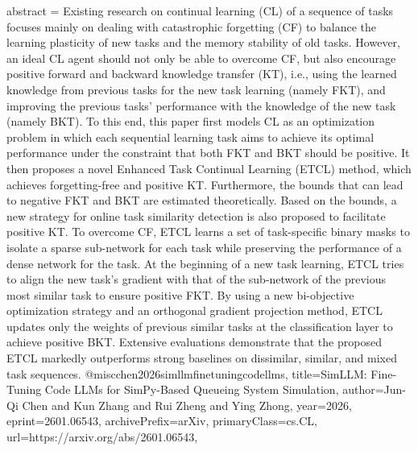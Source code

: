 {      abstract = {Existing research on continual learning (CL) of a sequence of tasks focuses mainly on dealing with catastrophic forgetting (CF) to balance the learning plasticity of new tasks and the memory stability of old tasks. However, an ideal CL agent should not only be able to overcome CF, but also encourage positive forward and backward knowledge transfer (KT), i.e., using the learned knowledge from previous tasks for the new task learning (namely FKT), and improving the previous tasks' performance with the knowledge of the new task (namely BKT). To this end, this paper first models CL as an optimization problem in which each sequential learning task aims to achieve its optimal performance under the constraint that both FKT and BKT should be positive. It then proposes a novel Enhanced Task Continual Learning (ETCL) method, which achieves forgetting-free and positive KT. Furthermore, the bounds that can lead to negative FKT and BKT are estimated theoretically. Based on the bounds, a new strategy for online task similarity detection is also proposed to facilitate positive KT. To overcome CF, ETCL learns a set of task-specific binary masks to isolate a sparse sub-network for each task while preserving the performance of a dense network for the task. At the beginning of a new task learning, ETCL tries to align the new task's gradient with that of the sub-network of the previous most similar task to ensure positive FKT. By using a new bi-objective optimization strategy and an orthogonal gradient projection method, ETCL updates only the weights of previous similar tasks at the classification layer to achieve positive BKT. Extensive evaluations demonstrate that the proposed ETCL markedly outperforms strong baselines on dissimilar, similar, and mixed task sequences.}
}@misc{chen2026simllmfinetuningcodellms,
      title={SimLLM: Fine-Tuning Code LLMs for SimPy-Based Queueing System Simulation}, 
      author={Jun-Qi Chen and Kun Zhang and Rui Zheng and Ying Zhong},
      year={2026},
      eprint={2601.06543},
      archivePrefix={arXiv},
      primaryClass={cs.CL},
      url={https://arxiv.org/abs/2601.06543},
}
